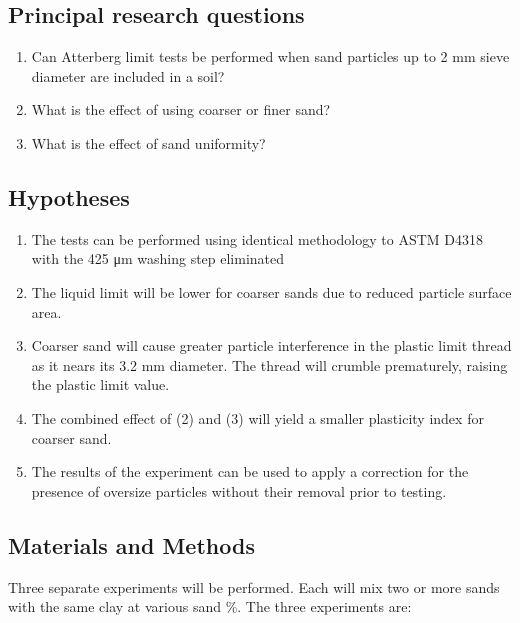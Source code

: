 \documentclass[
  letterpaper,
  openany]{book}
\begin{document}
\hypertarget{principal-research-questions-3}{%
\subsection{Principal research questions}\label{principal-research-questions-3}}

\begin{enumerate}
\def\labelenumi{\arabic{enumi}.}
\item
  Can Atterberg limit tests be performed when sand particles up to 2 mm sieve diameter are included in a soil?
\item
  What is the effect of using coarser or finer sand?
\item
  What is the effect of sand uniformity?
\end{enumerate}

\hypertarget{hypotheses-3}{%
\subsection{Hypotheses}\label{hypotheses-3}}

\begin{enumerate}
\def\labelenumi{\arabic{enumi}.}
\item
  The tests can be performed using identical methodology to ASTM D4318 with the 425 μm washing step eliminated
\item
  The liquid limit will be lower for coarser sands due to reduced particle surface area.
\item
  Coarser sand will cause greater particle interference in the plastic limit thread as it nears its 3.2 mm diameter. The thread will crumble prematurely, raising the plastic limit value.
\item
  The combined effect of (2) and (3) will yield a smaller plasticity index for coarser sand.
\item
  The results of the experiment can be used to apply a correction for the presence of oversize particles without their removal prior to testing.
\end{enumerate}

\hypertarget{materials-and-methods-3}{%
\subsection{Materials and Methods}\label{materials-and-methods-3}}

Three separate experiments will be performed.
Each will mix two or more sands with the same clay at various sand \%.
The three experiments are:
\end{document}
